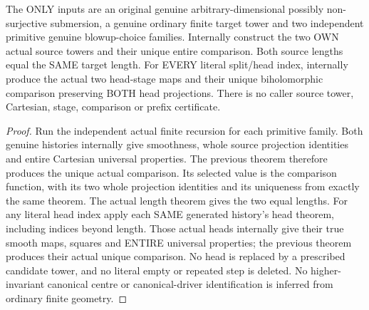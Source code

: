 \begin{theorem}
\label{hir:submersion-cartesian-choice-original-comparison}
\leanok
{}
The ONLY inputs are an original genuine arbitrary-dimensional possibly
non-surjective submersion, a genuine ordinary finite target tower and two
independent primitive genuine blowup-choice families. Internally construct
the two OWN actual source towers and their unique entire comparison. Both
source lengths equal the SAME target length. For EVERY literal split/head
index, internally produce the actual two head-stage maps and their unique
biholomorphic comparison preserving BOTH head projections. There is no
caller source tower, Cartesian, stage, comparison or prefix certificate.
\end{theorem}
\begin{proof}
Run the independent actual finite recursion for each primitive family.
Both genuine histories internally give smoothness, whole source projection
identities and entire Cartesian universal properties. The previous theorem
therefore produces the unique actual comparison. Its selected value is
the comparison function, with its two whole projection identities and its
uniqueness from exactly the same theorem. The actual length theorem gives
the two equal lengths. For any literal head index apply each SAME generated
history's head theorem, including indices beyond length. Those actual
heads internally give their true smooth maps, squares and ENTIRE universal
properties; the previous theorem produces their actual unique comparison.
No head is replaced by a prescribed candidate tower, and no literal empty
or repeated step is deleted. No higher-invariant canonical centre or
canonical-driver identification is inferred from ordinary finite geometry.
\end{proof}

